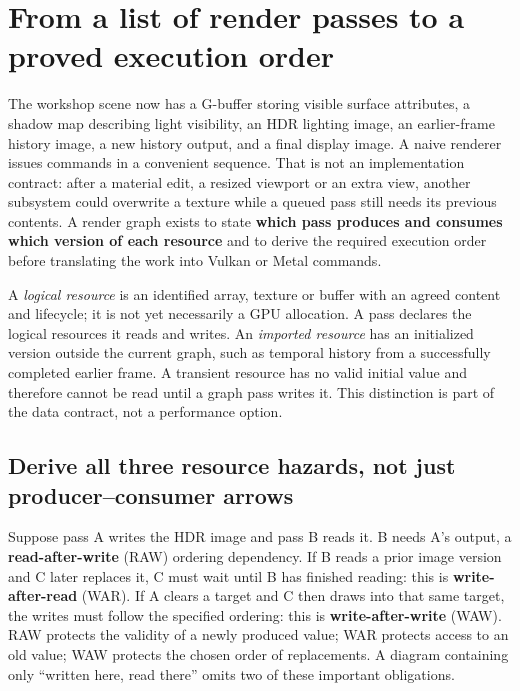 \section{From a list of render passes to a proved execution order}\label{06-engine-ii-ch042-from-a-list-of-render-passes-to-a-proved-execution-order}

The workshop scene now has a G-buffer storing visible surface attributes, a shadow map describing light visibility, an HDR lighting image, an earlier-frame history image, a new history output, and a final display image. A naive renderer issues commands in a convenient sequence. That is not an implementation contract: after a material edit, a resized viewport or an extra view, another subsystem could overwrite a texture while a queued pass still needs its previous contents. A render graph exists to state \textbf{which pass produces and consumes which version of each resource} and to derive the required execution order before translating the work into Vulkan or Metal commands.

A \emph{logical resource} is an identified array, texture or buffer with an agreed content and lifecycle; it is not yet necessarily a GPU allocation. A pass declares the logical resources it reads and writes. An \emph{imported resource} has an initialized version outside the current graph, such as temporal history from a successfully completed earlier frame. A transient resource has no valid initial value and therefore cannot be read until a graph pass writes it. This distinction is part of the data contract, not a performance option.

\subsection{Derive all three resource hazards, not just producer--consumer arrows}\label{06-engine-ii-ch042-derive-all-three-resource-hazards-not-just-producerconsumer-arrows}

Suppose pass A writes the HDR image and pass B reads it. B needs A's output, a \textbf{read-after-write} (RAW) ordering dependency. If B reads a prior image version and C later replaces it, C must wait until B has finished reading: this is \textbf{write-after-read} (WAR). If A clears a target and C then draws into that same target, the writes must follow the specified ordering: this is \textbf{write-after-write} (WAW). RAW protects the validity of a newly produced value; WAR protects access to an old value; WAW protects the chosen order of replacements. A diagram containing only ``written here, read there'' omits two of these important obligations.


